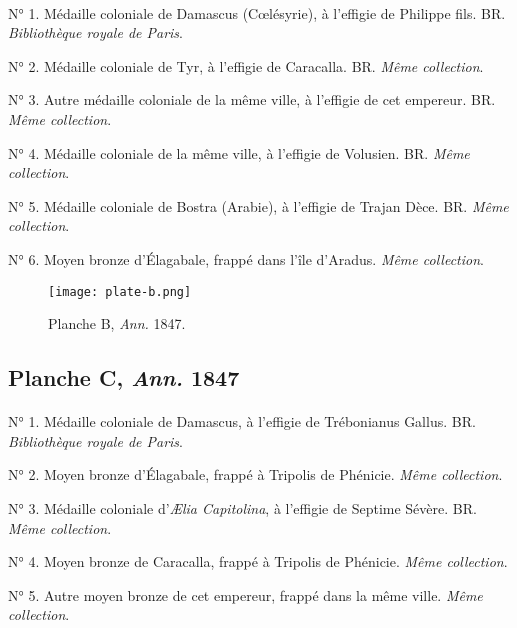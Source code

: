 \documentclass[a4paper, 11pt, oneside, polutonikogreek, french]{article}
\begin{document}
\paragraph{}
N° 1. Médaille coloniale de Damascus (Cœlésyrie), à l'effigie de Philippe fils. BR. \emph{Bibliothèque royale de Paris}.

N° 2. Médaille coloniale de Tyr, à l'effigie de Caracalla. BR. \emph{Même collection}.

N° 3. Autre médaille coloniale de la même ville, à l'effigie de cet empereur. BR. \emph{Même collection}.

N° 4. Médaille coloniale de la même ville, à l'effigie de Volusien. BR. \emph{Même collection}.

N° 5. Médaille coloniale de Bostra (Arabie), à l'effigie de Trajan Dèce. BR. \emph{Même collection}.

N° 6. Moyen bronze d'Élagabale, frappé dans l'île d'Aradus. \emph{Même collection}.
\vspace*{\fill}
\clearpage
\pagestyle{fancy}
\fancyhf{}
\cfoot{{\thepage}}
\vspace*{\fill}
\begin{figure}[H]
\centering
\texttt{[image: plate-b.png]}
\caption{Planche B, \emph{Ann.} 1847.}
\end{figure}
\vspace*{\fill}
\clearpage
\pagestyle{plain}
\vspace*{\fill}
\subsection{Planche C, \emph{Ann.} 1847}
\paragraph{}
N° 1. Médaille coloniale de Damascus, à l'effigie de Trébonianus Gallus. BR. \emph{Bibliothèque royale de Paris}.

N° 2. Moyen bronze d'Élagabale, frappé à Tripolis de Phénicie. \emph{Même collection}.

N° 3. Médaille coloniale d'\emph{Ælia Capitolina}, à l'effigie de Septime Sévère. BR. \emph{Même collection}.

N° 4. Moyen bronze de Caracalla, frappé à Tripolis de Phénicie. \emph{Même collection}.

N° 5. Autre moyen bronze de cet empereur, frappé dans la même ville. \emph{Même collection}.
\end{document}
